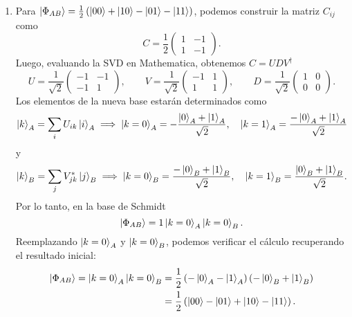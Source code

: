 \documentclass{scrartcl}
\newcommand{\inv}[1]{\frac{1}{#1}}
\DeclareRobustCommand{\[}{\begin{equation}}
\DeclareRobustCommand{\]}{\end{equation}}
\begin{document}
\begin{enumerate}
\begin{enumerate}
        
        \item Para $\ket{\Phi_{AB}} = \inv{2} \left(\ket{00} + \ket{10} - \ket{01} - \ket{11}\right)$, podemos construir la matriz $C_{ij}$ como
        \[
            C = \inv{2}
            \begin{pmatrix}
                1 & -1 \\
                1 & -1 
            \end{pmatrix}.
        \]
        Luego, evaluando la SVD en Mathematica, obtenemos $C = U D V^\dagger$
        \[
            U = \inv{\sqrt{2}}
            \begin{pmatrix}
                -1 & -1 \\
                -1 & 1
            \end{pmatrix},
            \quad \quad
            V = \inv{\sqrt{2}}
            \begin{pmatrix}
                -1 & 1 \\
                1 & 1
            \end{pmatrix},
            \quad \quad
            D = \inv{\sqrt{2}}
            \begin{pmatrix}
                1 & 0 \\
                0 & 0
            \end{pmatrix}.
        \]
        Los elementos de la nueva base estarán determinados como
        \[ \ket{k}_A = \sum_i U_{ik} \ket{i}_A \implies \ket{k = 0}_A = -\frac{\ket{0}_A + \ket{1}_A}{\sqrt{2}}, \quad \ket{k = 1}_A = \frac{-\ket{0}_A + \ket{1}_A}{\sqrt{2}} \]
        y
        \[ \ket{k}_B = \sum_j V_{jk}^* \ket{j}_B \implies \ket{k = 0}_B = \frac{-\ket{0}_B + \ket{1}_B}{\sqrt{2}}, \quad \ket{k = 1}_B = \frac{\ket{0}_B + \ket{1}_B}{\sqrt{2}}. \]
        Por lo tanto, en la base de Schmidt
        \[ \ket{\Phi_{AB}} = 1 \ket{k=0}_A \ket{k=0}_B. \]
        Reemplazando $\ket{k = 0}_A$ y $\ket{k = 0}_B$, podemos verificar el cálculo recuperando el resultado inicial:
        \begin{align}
            \ket{\Phi_{AB}} = \ket{k=0}_A \ket{k=0}_B &= \inv{2} \left( -\ket{0}_A - \ket{1}_A \right) \left( -\ket{0}_B + \ket{1}_B \right) \\
                &= \inv{2} \left( \ket{00} - \ket{01} + \ket{10} - \ket{11} \right).
        \end{align}
    \end{enumerate}
    
    
    

\end{enumerate}
\end{document}
